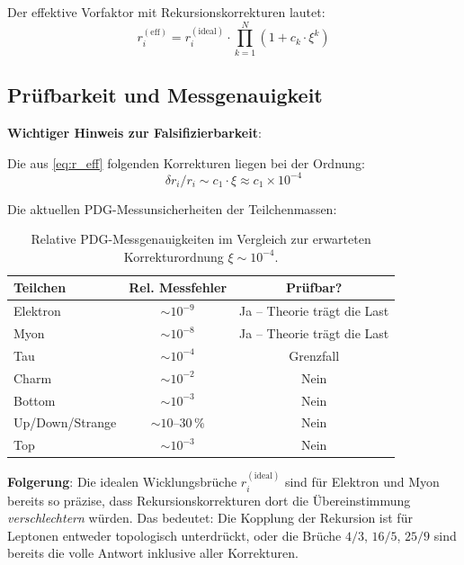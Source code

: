 Der effektive Vorfaktor mit Rekursionskorrekturen lautet:
\begin{equation}
    r_i^{(\mathrm{eff})} = r_i^{(\mathrm{ideal})}
    \cdot \prod_{k=1}^{N} \left(1 + c_k \cdot \xi^k\right)
    \label{eq:r_eff}
\end{equation}

\subsection{Prüfbarkeit und Messgenauigkeit}

\textbf{Wichtiger Hinweis zur Falsifizierbarkeit}:

Die aus \eqref{eq:r_eff} folgenden Korrekturen liegen bei der Ordnung:
\begin{equation}
    \delta r_i / r_i \sim c_1 \cdot \xi \approx c_1 \times 10^{-4}
\end{equation}

Die aktuellen PDG-Messunsicherheiten der Teilchenmassen:

\begin{table}[htbp]
\centering
\begin{tabular}{lcc}
\toprule
\textbf{Teilchen} & \textbf{Rel. Messfehler} & \textbf{Prüfbar?} \\
\midrule
Elektron & $\sim 10^{-9}$ & Ja -- Theorie trägt die Last \\
Myon     & $\sim 10^{-8}$ & Ja -- Theorie trägt die Last \\
Tau      & $\sim 10^{-4}$ & Grenzfall \\
Charm    & $\sim 10^{-2}$ & Nein \\
Bottom   & $\sim 10^{-3}$ & Nein \\
Up/Down/Strange & $\sim 10\text{--}30\,\%$ & Nein \\
Top      & $\sim 10^{-3}$ & Nein \\
\bottomrule
\end{tabular}
\caption{Relative PDG-Messgenauigkeiten im Vergleich zur erwarteten
Korrekturordnung $\xi \sim 10^{-4}$.}
\label{tab:messgenauigkeit}
\end{table}

\textbf{Folgerung}: Die idealen Wicklungsbrüche $r_i^{(\mathrm{ideal})}$
sind für Elektron und Myon bereits so präzise, dass Rekursionskorrekturen
dort die Übereinstimmung \emph{verschlechtern} würden. Das bedeutet:
Die Kopplung der Rekursion ist für Leptonen entweder topologisch
unterdrückt, oder die Brüche $4/3$, $16/5$, $25/9$ sind bereits
die volle Antwort inklusive aller Korrekturen.

